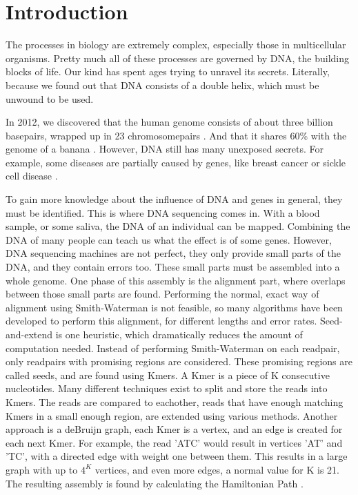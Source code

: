 \documentclass[../main/thesis.tex]{subfiles}
\begin{document}
\chapter{Introduction}
\ifdefined\main
\else

\fi

The processes in biology are extremely complex, especially those in multicellular organisms.
Pretty much all of these processes are governed by DNA, the building blocks of life.
Our kind has spent ages trying to unravel its secrets.
Literally, because we found out that DNA consists of a double helix, which must be unwound to be used.

In 2012, we discovered that the human genome consists of about three billion basepairs, wrapped up in 23 chromosomepairs \cite{human_genome_project}.
And that it shares 60\% with the genome of a banana \cite{banana}.
However, DNA still has many unexposed secrets.
For example, some diseases are partially caused by genes, like breast cancer or sickle cell disease \cite{genomic_diseases}.

To gain more knowledge about the influence of DNA and genes in general, they must be identified.
This is where DNA sequencing comes in.
With a blood sample, or some saliva, the DNA of an individual can be mapped.
Combining the DNA of many people can teach us what the effect is of some genes.
However, DNA sequencing machines are not perfect, they only provide small parts of the DNA, and they contain errors too.
These small parts must be assembled into a whole genome.
One phase of this assembly is the alignment part, where overlaps between those small parts are found.
Performing the normal, exact way of alignment using Smith-Waterman is not feasible, so many algorithms have been developed to perform this alignment, for different lengths and error rates.
Seed-and-extend is one heuristic, which dramatically reduces the amount of computation needed.
Instead of performing Smith-Waterman on each readpair, only readpairs with promising regions are considered.
These promising regions are called seeds, and are found using Kmers.
A Kmer is a piece of K consecutive nucleotides.
Many different techniques exist to split and store the reads into Kmers.
The reads are compared to eachother, reads that have enough matching Kmers in a small enough region, are extended using various methods.
Another approach is a deBruijn graph, each Kmer is a vertex, and an edge is created for each next Kmer.
For example, the read 'ATC' would result in vertices 'AT' and 'TC', with a directed edge with weight one between them.
This results in a large graph with up to $4^K$ vertices, and even more edges, a normal value for K is 21.
The resulting assembly is found by calculating the Hamiltonian Path \cite{Euler_Hamil_paths}.
\end{document}
